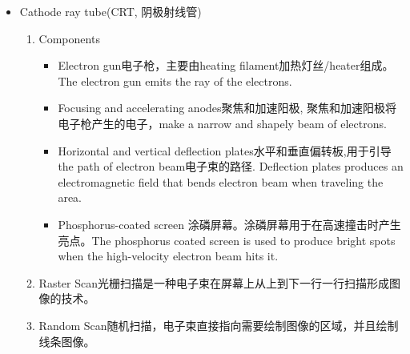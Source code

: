 \documentclass[UTF8]{ctexart}
\begin{document}
\begin{itemize}
\begin{enumerate}
        \item 输出设备
        \begin{itemize}
            \item impact printer击打式打印机，击打式打印机有一个打印头，打印头会撞击装满墨水的色带，色带被打印头压在纸上，字就印在了纸上。鼓式打印机，菊花轮打印机，点阵打印机。
            \item Non-impact printer非击打式打印机，非击打式打印机使用喷头将墨水喷在纸上，形成文字和图案。喷墨打印机，激光打印机。
            \item plotter 绘图仪 o、o
        \end{itemize}
        \item 显示设备
        
        显示设备也是输出设备用于以视觉形式呈现信息。
        Display System也被称为video monitor/ video display unit。CRT，LED，LCD，DVST。

        
    \end{enumerate}

    \item Cathode ray tube(CRT, 阴极射线管)
    \begin{enumerate}
        \item Components
        \begin{itemize}
            \item Electron gun电子枪，主要由heating filament加热灯丝/heater组成。The electron gun emits the ray of the electrons.
            \item Focusing and accelerating anodes聚焦和加速阳极, 聚焦和加速阳极将电子枪产生的电子，make a narrow and shapely beam of electrons.
            \item Horizontal and vertical deflection plates水平和垂直偏转板,用于引导the path of electron beam电子束的路径. Deflection plates produces an electromagnetic field that bends electron beam when traveling the area.
            \item Phosphorus-coated screen 涂磷屏幕。涂磷屏幕用于在高速撞击时产生亮点。The phosphorus coated screen is used to produce bright spots when the high-velocity electron beam hits it.
        \end{itemize}
        \item Raster Scan光栅扫描是一种电子束在屏幕上从上到下一行一行扫描形成图像的技术。
        \item Random Scan随机扫描，电子束直接指向需要绘制图像的区域，并且绘制线条图像。
        

\end{enumerate}
\end{itemize}
\end{document}
